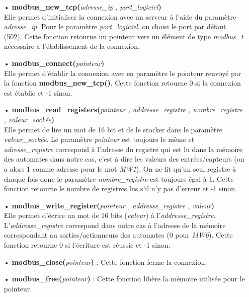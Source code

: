 \documentclass[a4paper,french, titlepage]{book}
\begin{document}
\begin{itemize}
\item[ ]
\item[•] \textbf{modbus\_new\_tcp(}\emph{adresse\_ip} , \emph{port\_logiciel}\textbf{)}\\
Elle permet d'initialiser la connexion avec un serveur à l'aide du paramètre \emph{adresse\_ip}. Pour le paramètre \emph{port\_logiciel}, on choisi le port par défaut (502). Cette fonction retourne un pointeur vers un élément de type \emph{modbus\_t} nécessaire à l'établissement de la connexion.
\item[ ]
\item[•] \textbf{modbus\_connect(}\emph{pointeur}\textbf{)}\\
Elle permet d'établir la connexion avec en paramètre le pointeur renvoyé par la fonction \textbf{modbus\_new\_tcp()}. Cette fonction retourne 0 si la connexion est établie et -1 sinon.
\item[ ]
\item[•] \textbf{modbus\_read\_registers(}\emph{pointeur , addresse\_registre , nombre\_registre , valeur\_sockée}\textbf{)}\\
Elle permet de lire un mot de 16 bit et de le stocker dans le paramètre \emph{valeur\_sockée}. Le paramètre \emph{pointeur} est toujours le même et \emph{adresse\_registre} correspond à l'adresse du registre qui est lu dans la mémoire des automates dans notre cas, c'est à dire les valeurs des entrées/capteurs (on a alors 1 comme adresse pour le mot \emph{MW1}). On ne lit qu'un seul registre à chaque fois donc le paramètre \emph{nombre\_registre} est toujours égal à 1. Cette fonction retourne le nombre de registres lus s'il n'y pas d'erreur et -1 sinon.
\item[ ]
\item[•] \textbf{modbus\_write\_register(}\emph{pointeur , addresse\_registre , valeur}\textbf{)}\\
Elle permet d'écrire un mot de 16 bits (\emph{valeur}) à l'\emph{addresse\_registre}. L'\emph{addresse\_registre} correspond dans notre cas à l'adresse de la mémoire correspondant au sorties/actionneurs des automates (0 pour \emph{MW0}). Cette fonction retourne 0 si l'écriture est réussie et -1 sinon.
\item[ ]
\item[•] \textbf{modbus\_close(}\emph{pointeur}\textbf{)} : Cette fonction ferme la connexion.
\item[ ]
\item[•] \textbf{modbus\_free(}\emph{pointeur}\textbf{)} : Cette fonction libère la mémoire utilisée pour le pointeur.
\end{itemize}
\end{document}
